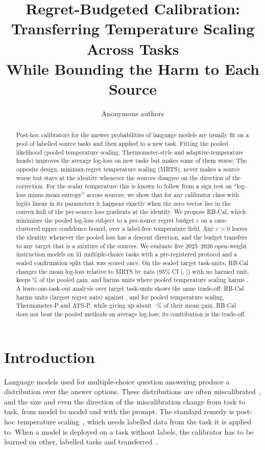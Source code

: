 \documentclass[11pt]{article}
\title{Regret-Budgeted Calibration:\\Transferring Temperature Scaling Across Tasks\\While Bounding the Harm to Each Source}
\author{Anonymous authors}
\date{}
\theoremstyle{remark}
\begin{document}
\maketitle

\begin{abstract}
Post-hoc calibrators for the answer probabilities of language models are usually fit on a pool of labelled source tasks and then applied to a new task.
Fitting the pooled likelihood (pooled temperature scaling, Thermometer-style and adaptive-temperature heads) improves the average log-loss on new tasks but makes some of them worse.
The opposite design, minimax-regret temperature scaling (MRTS), never makes a source worse but stays at the identity whenever the sources disagree on the direction of the correction.
For the scalar temperature this is known to follow from a sign test on ``log-loss minus mean entropy'' across sources; we show that for any calibrator class with logits linear in its parameters it happens exactly when the zero vector lies in the convex hull of the per-source loss gradients at the identity.
We propose RB-Cal, which minimises the pooled log-loss subject to a per-source regret budget $\varepsilon$ on a case-clustered upper confidence bound, over a label-free temperature field.
Any $\varepsilon>0$ leaves the identity whenever the pooled loss has a descent direction, and the budget transfers to any target that is a mixture of the sources.
We evaluate five 2025--2026 open-weight instruction models on 31 multiple-choice tasks with a pre-registered protocol and a sealed confirmation split that was scored once.
On the \NConfirm{} sealed target task-units, RB-Cal changes the mean log-loss relative to MRTS by \EOneDiff{} nats (95\% CI [\EOneLo, \EOneHi]) with no harmed unit, keeps \ETwoRetain\% of the pooled gain, and harms \ETwoHarmP{} units where pooled temperature scaling harms \ETwoHarmPooled.
A leave-one-task-out analysis over \NLoto{} target task-units shows the same trade-off: RB-Cal harms \LotoPrimHarm{} units (largest regret \LotoPrimHarmMax{} nats) against \LotoPooledHarm, \LotoThermoHarm{} and \LotoAtsHarm{} for pooled temperature scaling, Thermometer-P and ATS-P, while giving up about \LotoRetainLo--\LotoRetainHi\% of their mean gain.
RB-Cal does not beat the pooled methods on average log-loss; its contribution is the trade-off.
\end{abstract}

\section{Introduction}
Language models used for multiple-choice question answering produce a distribution over the answer options.
These distributions are often miscalibrated~\citep{kadavath2022know,zhao2021calibrate}, and the size and even the direction of the miscalibration change from task to task, from model to model and with the prompt.
The standard remedy is post-hoc temperature scaling~\citep{guo2017calibration,platt1999probabilistic}, which needs labelled data from the task it is applied to.
When a model is deployed on a task without labels, the calibrator has to be learned on other, labelled tasks and transferred~\citep{yu2022multidomain,shen2024thermometer,xie2024ats}.
\end{document}
